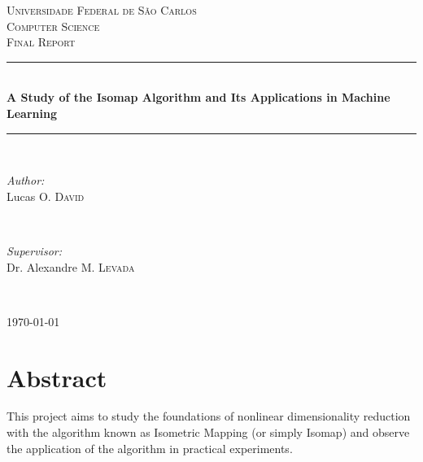 \documentclass[12pt]{article}
\begin{document}
\begin{titlepage}

\newcommand{\HRule}{\rule{\linewidth}{0.5mm}}

\center

\textsc{\LARGE Universidade Federal de São Carlos}\\[1.5cm]
\textsc{\Large Computer Science}\\[0.5cm]
\textsc{\large Final Report}\\[0.5cm]

\HRule \\[0.4cm]

{ \huge \bfseries A Study of the Isomap Algorithm and Its Applications in Machine Learning}\\[0.4cm]

\HRule \\[1.5cm]

\begin{minipage}{0.4\textwidth}
\begin{flushleft} \large
\emph{Author:}\\
Lucas O. \textsc{David}
\end{flushleft}
\end{minipage}
~
\begin{minipage}{0.4\textwidth}
\begin{flushright} \large
\emph{Supervisor:} \\
Dr. Alexandre M. \textsc{Levada}
\end{flushright}
\end{minipage}\\[4cm]

\vfill

{\large \today}\\[3cm]

\end{titlepage}

\tableofcontents
\newpage

\thispagestyle{empty}
\listoffigures
\newpage

\thispagestyle{empty}
\listoftables
\newpage

\section{Abstract}

This project aims to study the foundations of nonlinear dimensionality reduction with the algorithm known as Isometric Mapping (or simply Isomap) and observe the application of the algorithm in practical experiments.
\end{document}
